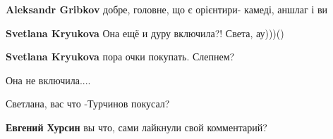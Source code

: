 \begin{itemize}
\begin{itemize}
 
\textbf{Aleksandr Gribkov} добре, головне, що є орієнтири- камеді, аншлаг і ви

 
\textbf{Svetlana Kryukova}
Она ещё и дуру включила?! Света, ау)))()

 
\textbf{Svetlana Kryukova} пора очки покупать. Слепнем?

 
Она не включила....

\end{itemize}

 

Светлана, вас что -Турчинов покусал?

\begin{itemize}

 
\textbf{Евгений Хурсин} вы что, сами лайкнули свой комментарий?

 

\end{itemize}
\end{itemize}
